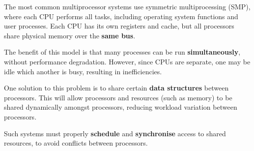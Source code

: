\documentclass{article}
\begin{document}
\begin{tcolorboxlarge}[title={Symmetric Multiprocessing}, parbox=false]
    The most common multiprocessor systems use symmetric multiprocessing (SMP),
    where each CPU performs all tasks, including operating system functions and user
    processes. Each CPU has its own registers and cache, but all processors share
    physical memory over the \textbf{same bus}.

    The benefit of this model is that many processes can be run \textbf{simultaneously},
    without performance degradation. However, since CPUs are separate, one
    may be idle which another is busy, resulting in inefficiencies.

    One solution to this problem is to share certain \textbf{data structures} between processors.
    This will allow processors and resources (such as memory) to be shared
    dynamically amongst processors, reducing workload variation between processors.

    Such systems must properly \textbf{schedule} and \textbf{synchronise} access to shared resources,
    to avoid conflicts between processors.
\end{tcolorboxlarge}
\end{document}
